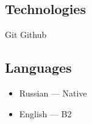 \documentclass[letter]{deedy-resume}
\begin{document}
\begin{minipage}[t]{0.33\textwidth}
        \sectionspace %

        \subsection{Technologies}
        \vspace{0.5\topsep}

        Git \textbullet{} Github

        \sectionspace %

        \subsection{Languages}
        \begin{itemize}[leftmargin=1em]
            \setlength\itemsep{0em}
            \item Russian --- Native
            \item English --- B2
        \end{itemize}


        \sectionspace
    \end{minipage}
    \hfill
\end{document}
